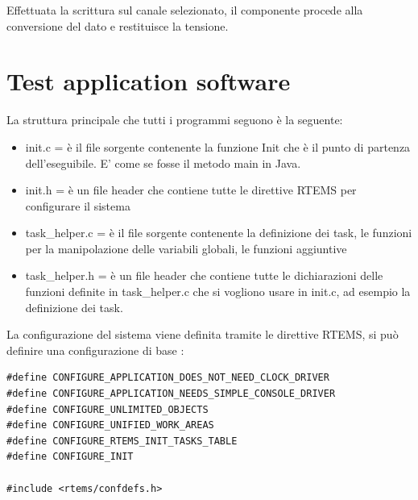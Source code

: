 \documentclass[12pt, a4paper, titlepage, oneside]{book}
\begin{document}
\begin{flushleft}
Effettuata la scrittura sul canale selezionato, il componente procede alla conversione del dato e restituisce la tensione. \\

\newpage
\section{Test application software}
La struttura principale che tutti i programmi seguono è la seguente:
\begin{itemize}
    \item init.c = è il file sorgente contenente la funzione Init che è il punto di partenza dell'eseguibile. E' come se fosse il metodo main in Java.
    \item init.h = è un file header che contiene tutte le direttive RTEMS per configurare il sistema
    \item task\_helper.c = è il file sorgente contenente la definizione dei task, le funzioni per la manipolazione delle variabili globali, le funzioni aggiuntive 
    \item task\_helper.h = è un file header che contiene tutte le dichiarazioni delle funzioni definite in task\_helper.c che si vogliono usare in init.c, ad esempio la definizione dei task.
\end{itemize}
La configurazione del sistema viene definita tramite le direttive RTEMS, si può definire una configurazione di base :
\begin{lstlisting}[style = CStyle]
#define CONFIGURE_APPLICATION_DOES_NOT_NEED_CLOCK_DRIVER
#define CONFIGURE_APPLICATION_NEEDS_SIMPLE_CONSOLE_DRIVER
#define CONFIGURE_UNLIMITED_OBJECTS
#define CONFIGURE_UNIFIED_WORK_AREAS
#define CONFIGURE_RTEMS_INIT_TASKS_TABLE
#define CONFIGURE_INIT

#include <rtems/confdefs.h>


\end{lstlisting}
\end{flushleft}
\end{document}
